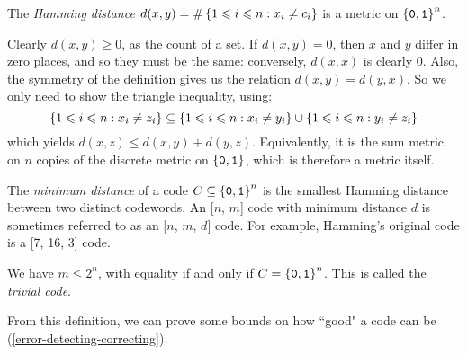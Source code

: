 \documentclass{article}
\begin{document}
\begin{proposition}
    The \textit{Hamming distance} $d(x, y) = \#\left\lbrace 1 \leqslant i \leqslant n : x_i \neq c_i \right\rbrace$ is a metric on $\left\lbrace \texttt{0}, \texttt{1} \right\rbrace^n$.
\end{proposition}
\begin{prf}
    Clearly $d(x, y) \geq 0$, as the count of a set. If $d(x, y) = 0$, then $x$ and $y$ differ in zero places, and so they must be the same: conversely, $d(x, x)$ is clearly 0. Also, the symmetry of the definition gives us the relation $d(x, y) = d(y, x)$. So we only need to show the triangle inequality, using:
    \[
	\left\lbrace 1 \leqslant i \leqslant n : x_i \neq z_i \right\rbrace \subseteq \left\lbrace 1 \leqslant i \leqslant n : x_i \neq y_i \right\rbrace \cup \left\lbrace 1 \leqslant i \leqslant n : y_i \neq z_i \right\rbrace
	\]
	which yields $d(x, z) \leq d(x, y) + d(y, z)$. Equivalently, it is the sum metric on $n$ copies of the discrete metric on $\left\lbrace \texttt{0}, \texttt{1} \right\rbrace$, which is therefore a metric itself.
\end{prf}

\begin{definition}
    The \textit{minimum distance} of a code $C \subseteq \left\lbrace \texttt{0}, \texttt{1} \right\rbrace^n$ is the smallest Hamming distance between two distinct codewords. An [$n$, $m$] code with minimum distance $d$ is sometimes referred to as an [$n$, $m$, $d$] code. For example, Hamming's original code is a [7, 16, 3] code.
\end{definition}

\begin{note}
	We have $m \leq 2^n$, with equality if and only if $C = \left\lbrace \texttt{0}, \texttt{1} \right\rbrace^n$. This is called the \textit{trivial code}.
\end{note}

From this definition, we can prove some bounds on how ``good" a code can be (\ref{error-detecting-correcting}).
\end{document}
